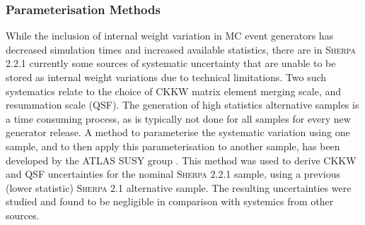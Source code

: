 \subsubsection{Parameterisation Methods}
While the inclusion of internal weight variation in MC event generators has decreased simulation times and increased available statistics, there are in \textsc{Sherpa 2.2.1} currently some sources of systematic uncertainty that are unable to be stored as internal weight variations due to technical limitations. Two such systematics relate to the choice of CKKW matrix element merging scale, and resummation scale (QSF). The generation of high statistics alternative samples is a time consuming process, as is typically not done for all samples for every new generator release. A method to parameterise the systematic variation using one sample, and to then apply this parameterisation to another sample, has been developed by the ATLAS SUSY group \cite{Anders:2125718}. This method was used to derive CKKW and QSF uncertainties for the nominal \textsc{Sherpa 2.2.1} sample, using a previous (lower statistic) \textsc{Sherpa 2.1} alternative sample. The resulting uncertainties were studied and found to be negligible in comparison with systemics from other sources.


